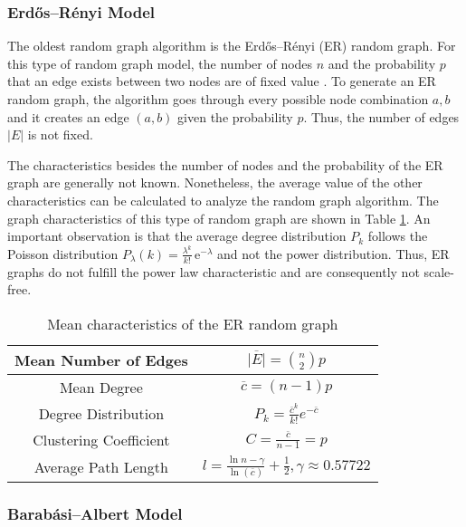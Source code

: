 \subsubsection{Erdős–Rényi Model}

The oldest random graph algorithm is the 
Erdős–Rényi (ER) random graph. For this type of random graph model, the
number of nodes $n$ and the probability $p$ that an 
edge exists between two nodes are of fixed value \cite{basicnetwork}. 
To generate an ER random graph, the algorithm goes through 
every possible node combination $a, b$ and it creates an edge 
$(a, b)$ given the probability $p$. 
Thus, the number of edges $|E|$ is not fixed.

The characteristics besides the number of nodes and the
probability of the ER graph are generally not known.
Nonetheless, the average value of the other
characteristics can be calculated to analyze the random graph algorithm.
The graph characteristics of this type of random graph are shown in Table 
\ref{erdos-model}.
An important observation is that 
the average degree distribution $P_k$ follows the Poisson distribution
$P_\lambda (k) = \frac{\lambda^k}{k!}\, \mathrm{e}^{-\lambda}$ and
not the power distribution. Thus,
ER graphs do not fulfill the power law characteristic and are consequently
not scale-free. 

\begin{table}[ht!]
    \centering
    \begin{tabular}{|c | c |} 
     \hline
     Mean Number of Edges & 
     $\overline{|E|} = \binom{n}{2}p$  \\ 
     \hline
     Mean Degree & 
     $\overline{c} = (n-1)p$ \\ 
     \hline
     Degree Distribution & 
     $P_k = \frac{\overline{c}^k}{k!} e^{-\overline{c}}$ \\ 
     \hline
     Clustering Coefficient & 
     $C=\frac{\overline{c}}{n-1}=p$ \\ 
     \hline
     Average Path Length \cite{averagepath}& 
     $l = \frac{\ln{n} - \gamma}{\ln(\overline{c})} + \frac{1}{2}, 
     \gamma \approx 0.57722$ \\ 
     \hline
    \end{tabular}
    \caption{Mean characteristics of the ER random graph \cite{basicnetwork}}
    \label{erdos-model}
\end{table}

\subsubsection{Barabási–Albert Model}

